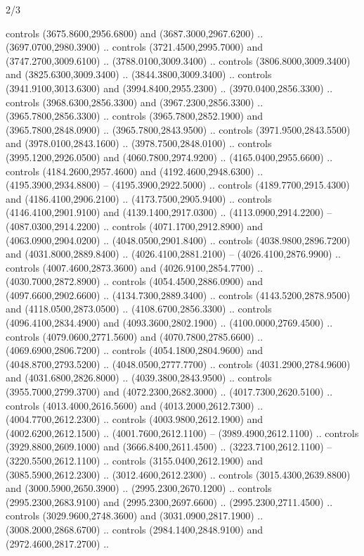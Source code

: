 \begin{flagdescription}{2/3}
\begin{scope}[shift={(0.5\flaglength,0.5)},scale=\flagwidth/130]
\begin{scope}[y=0.01mm, x=0.01mm,shift={(-3365,-2250)}]
  controls (3675.8600,2956.6800) and (3687.3000,2967.6200) ..
  (3697.0700,2980.3900) .. controls (3721.4500,2995.7000) and
  (3747.2700,3009.6100) .. (3788.0100,3009.3400) .. controls
  (3806.8000,3009.3400) and (3825.6300,3009.3400) .. (3844.3800,3009.3400) ..
  controls (3941.9100,3013.6300) and (3994.8400,2955.2300) ..
  (3970.0400,2856.3300) .. controls (3968.6300,2856.3300) and
  (3967.2300,2856.3300) .. (3965.7800,2856.3300) .. controls
  (3965.7800,2852.1900) and (3965.7800,2848.0900) .. (3965.7800,2843.9500) ..
  controls (3971.9500,2843.5500) and (3978.0100,2843.1600) ..
  (3978.7500,2848.0100) .. controls (3995.1200,2926.0500) and
  (4060.7800,2974.9200) .. (4165.0400,2955.6600) .. controls
  (4184.2600,2957.4600) and (4192.4600,2948.6300) .. (4195.3900,2934.8800) --
  (4195.3900,2922.5000) .. controls (4189.7700,2915.4300) and
  (4186.4100,2906.2100) .. (4173.7500,2905.9400) .. controls
  (4146.4100,2901.9100) and (4139.1400,2917.0300) .. (4113.0900,2914.2200) --
  (4087.0300,2914.2200) .. controls (4071.1700,2912.8900) and
  (4063.0900,2904.0200) .. (4048.0500,2901.8400) .. controls
  (4038.9800,2896.7200) and (4031.8000,2889.8400) .. (4026.4100,2881.2100) --
  (4026.4100,2876.9900) .. controls (4007.4600,2873.3600) and
  (4026.9100,2854.7700) .. (4030.7000,2872.8900) .. controls
  (4054.4500,2886.0900) and (4097.6600,2902.6600) .. (4134.7300,2889.3400) ..
  controls (4143.5200,2878.9500) and (4118.0500,2873.0500) ..
  (4108.6700,2856.3300) .. controls (4096.4100,2834.4900) and
  (4093.3600,2802.1900) .. (4100.0000,2769.4500) .. controls
  (4079.0600,2771.5600) and (4070.7800,2785.6600) .. (4069.6900,2806.7200) ..
  controls (4054.1800,2804.9600) and (4048.8700,2793.5200) ..
  (4048.0500,2777.7700) .. controls (4031.2900,2784.9600) and
  (4031.6800,2826.8000) .. (4039.3800,2843.9500) .. controls
  (3955.7000,2799.3700) and (4072.2300,2682.3000) .. (4017.7300,2620.5100) ..
  controls (4013.4000,2616.5600) and (4013.2000,2612.7300) ..
  (4004.7700,2612.2300) .. controls (4003.9800,2612.1900) and
  (4002.6200,2612.1500) .. (4001.7600,2612.1100) -- (3989.4900,2612.1100) ..
  controls (3929.8800,2609.1000) and (3666.8400,2611.4500) ..
  (3223.7100,2612.1100) -- (3220.5500,2612.1100) .. controls
  (3155.0400,2612.1900) and (3085.5900,2612.2300) .. (3012.4600,2612.2300) ..
  controls (3015.4300,2639.8800) and (3000.5900,2650.3900) ..
  (2995.2300,2670.1200) .. controls (2995.2300,2683.9100) and
  (2995.2300,2697.6600) .. (2995.2300,2711.4500) .. controls
  (3029.9600,2748.3600) and (3031.0900,2817.1900) .. (3008.2000,2868.6700) ..
  controls (2984.1400,2848.9100) and (2972.4600,2817.2700) ..

\end{scope}
\end{scope}
\end{flagdescription}
